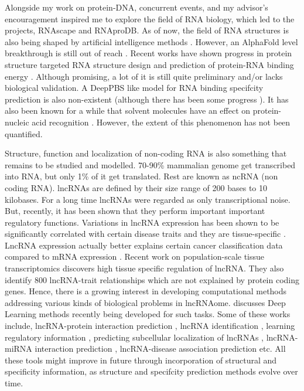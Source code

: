 Alongside my work on protein-DNA, concurrent events, and my advisor's encouragement inspired me to explore the field of RNA biology, which led to the projects, RNAscape and RNAproDB. As of now, the field of RNA structures is also being shaped by artificial intelligence methods \citep{he2024ribonanza}. However, an AlphaFold level breakthrough is still out of reach \citep{schneider2023will}. Recent works have shown progress in protein structure targeted RNA structure design \citep{nori2024rnaflow} and prediction of protein-RNA binding energy \citep{han2024copra}. Although promising, a lot of it is still quite preliminary and/or lacks biological validation. A DeepPBS like model for RNA binding specifcity prediction is also non-existent (although there has been some progress \citep{Lam2019}). It has also been known for a while that solvent molecules have an effect on protein-nucleic acid recognition \citep{Otwinowski1988}. However, the extent of this phenomenon has not been quantified.

Structure, function and localization of non-coding RNA is also something that remains to be studied and modelled. 70-90\% mammalian genome get transcribed into RNA, but only 1\% of it get translated. Rest are known as ncRNA (non coding RNA). lncRNAs are defined by their size range of 200 bases to 10 kilobases. For a long time lncRNAs were regarded as only transcriptional noise. But, recently, it has been shown that they perform important important regulatory functions. Variations in lncRNA expression has been shown to be significantly correlated with certain disease traits \citep{wapinski2011long} and they are tissue-specific \citep{seifuddin2020lncrnakb}. LncRNA expression actually better explains certain cancer
classification data compared to mRNA expression \citep{al2019long}. Recent work on population-scale tissue transcriptomics \citep{de2021population} discovers high tissue specific regulation of lncRNA. They also identify 800 lncRNA-trait relationships which are not explained by protein coding genes. Hence, there is a growing interest in developing computational methods addressing various kinds of biological problems in lncRNAome. \citep{alam2020deep} discusses Deep Learning methods recently being developed for
such tasks. Some of these works include, lncRNA-protein interaction prediction
\citep{pan2016ipminer, zhao2018bipartite, yi2018deep, zhan2019bgfe, peng2019rpiter}, lncRNA  identification \citep{baek2018lncrnanet,yang2018lncadeep, tripathi2016deeplnc},
learning regulatory information \citep{alam2019deepcnpp, alam2019deepel}, predicting subcellular localization of lncRNAs \citep{gudenas2018prediction},    lncRNA-miRNA interaction prediction \citep{huang2019predicting}, lncRNA-disease association prediction \citep{hu2019deep, xuan2019dual, al2019long, xuan2019graph} etc. All these tools might improve in future through incorporation of structural and specificity information, as structure and specifcity prediction methods evolve over time.

